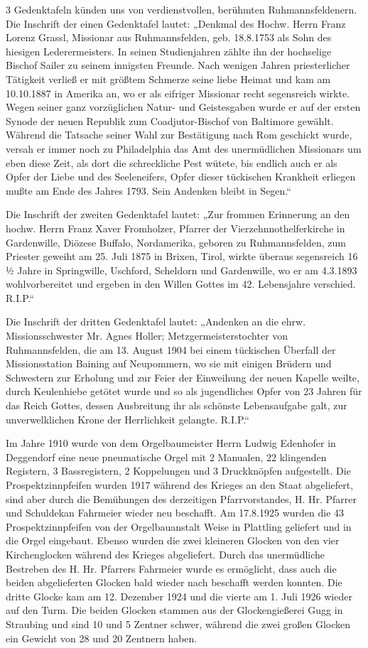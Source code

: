 \documentclass[12pt,a4paper]{book}
\begin{document}
3 Gedenktafeln künden uns von verdienstvollen, berühmten Ruhmannsfeldenern. Die
Inschrift der einen Gedenktafel lautet: „Denkmal des Hochw. Herrn Franz Lorenz
Grassl, Missionar aus Ruhmannsfelden, geb. 18.8.1753 als Sohn des hiesigen
Lederermeisters. In seinen Studienjahren zählte ihn der hochselige Bischof
Sailer zu seinem innigsten Freunde. Nach wenigen Jahren priesterlicher Tätigkeit
verließ er mit größtem Schmerze seine liebe Heimat und kam am 10.10.1887 in
Amerika an, wo er als eifriger Missionar recht segensreich wirkte. Wegen seiner
ganz vorzüglichen Natur- und Geistesgaben wurde er auf der ersten Synode der
neuen Republik zum Coadjutor-Bischof von Baltimore gewählt. Während die Tatsache
seiner Wahl zur Bestätigung nach Rom geschickt wurde, versah er immer noch zu
Philadelphia das Amt des unermüdlichen Missionars um eben diese Zeit, als dort
die schreckliche Pest wütete, bis endlich auch er als Opfer der Liebe und des
Seeleneifers, Opfer dieser tückischen Krankheit erliegen mußte am Ende des
Jahres 1793. Sein Andenken bleibt in Segen.“

Die Inschrift der zweiten Gedenktafel lautet: „Zur frommen Erinnerung an den
hochw. Herrn Franz Xaver Fromholzer, Pfarrer der Vierzehnnothelferkirche in
Gardenwille, Diözese Buffalo, Nordamerika, geboren zu Ruhmannsfelden, zum
Priester geweiht am 25. Juli 1875 in Brixen, Tirol, wirkte überaus segensreich
16 ½ Jahre in Springwille, Uschford, Scheldorn und Gardenwille, wo er am
4.3.1893 wohlvorbereitet und ergeben in den Willen Gottes im 42. Lebensjahre
verschied. R.I.P.“

Die Inschrift der dritten Gedenktafel lautet: „Andenken an die ehrw.
Missionsschwester Mr. Agnes Holler; Metzgermeisterstochter von Ruhmannsfelden,
die am 13. August 1904 bei einem tückischen Überfall der Missionsstation Baining
auf Neupommern, wo sie mit einigen Brüdern und Schwestern zur Erholung und zur
Feier der Einweihung der neuen Kapelle weilte, durch Keulenhiebe getötet wurde
und so als jugendliches Opfer von 23 Jahren für das Reich Gottes, dessen
Ausbreitung ihr als schönste Lebensaufgabe galt, zur unverwelklichen Krone der
Herrlichkeit gelangte. R.I.P.“

 Im Jahre 1910 wurde von dem Orgelbaumeister Herrn Ludwig Edenhofer in
 Deggendorf eine neue pneumatische Orgel mit 2 Manualen, 22 klingenden
 Registern, 3 Bassregistern, 2 Koppelungen und 3 Druckknöpfen aufgestellt. Die
 Prospektzinnpfeifen wurden 1917 während des Krieges an den Staat abgeliefert,
 sind aber durch die Bemühungen des derzeitigen Pfarrvorstandes, H. Hr. Pfarrer
 und Schuldekan Fahrmeier wieder neu beschafft. Am 17.8.1925 wurden die 43
 Prospektzinnpfeifen von der Orgelbauanstalt Weise in Plattling geliefert und in
 die Orgel eingebaut. Ebenso wurden die zwei kleineren Glocken von den vier
 Kirchenglocken während des Krieges abgeliefert. Durch das unermüdliche
 Bestreben des H. Hr. Pfarrers Fahrmeier wurde es ermöglicht, dass auch die
 beiden abgelieferten Glocken bald wieder nach beschafft werden konnten. Die
 dritte Glocke kam am 12. Dezember 1924 und die vierte am 1. Juli 1926 wieder
 auf den Turm. Die beiden Glocken stammen aus der Glockengießerei Gugg in
 Straubing und sind 10 und 5 Zentner schwer, während die zwei großen Glocken ein
 Gewicht von 28 und 20 Zentnern haben.
\end{document}
